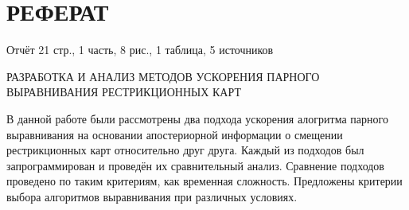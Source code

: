 \section*{РЕФЕРАТ}
Отчёт 21 стр., 1 часть, 8 рис., 1 таблица, 5 источников

РАЗРАБОТКА И АНАЛИЗ МЕТОДОВ УСКОРЕНИЯ ПАРНОГО ВЫРАВНИВАНИЯ РЕСТРИКЦИОННЫХ КАРТ

В данной работе были рассмотрены два подхода ускорения алогритма парного выравнивания на основании апостериорной информации о смещении рестрикционных карт относительно друг друга. Каждый из подходов был запрограммирован и проведён их сравнительный анализ. Сравнение подходов проведено по таким критериям, как временная сложность. Предложены критерии выбора алгоритмов выравнивания при различных условиях.